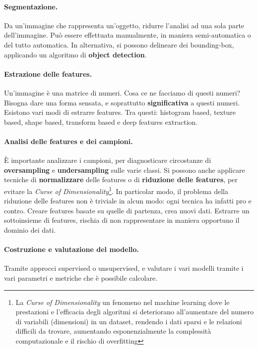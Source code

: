 \paragraph{Segmentazione.} Da un'immagine che rappresenta un'oggetto, ridurre l'analisi ad una sola parte dell'immagine. Può essere effettuata manualmente, in maniera semi-automatica o del tutto automatica. In alternativa, si possono delineare dei bounding-box, applicando un algoritmo di \textbf{object detection}.

\paragraph{Estrazione delle features.} Un'immagine è una matrice di numeri. Cosa ce ne facciamo di questi numeri? Bisogna dare una forma sensata, e soprattutto \textbf{significativa} a questi numeri. Esistono vari modi di estrarre features. Tra questi: histogram based, texture based, shape based, transform based e deep features extraction.

\paragraph{Analisi delle features e dei campioni.} È importante analizzare i campioni, per diagnosticare circostanze di \textbf{oversampling} e \textbf{undersampling} sulle varie classi. Si possono anche applicare tecniche di \textbf{normalizzare} delle features o di \textbf{riduzione delle features}, per evitare la \textit{Curse of Dimensionality}\footnote{La \textit{Curse of Dimensionality} un fenomeno nel machine learning dove le prestazioni e l'efficacia degli algoritmi si deteriorano all'aumentare del numero di variabili (dimensioni) in un dataset, rendendo i dati sparsi e le relazioni difficili da trovare, aumentando esponenzialmente la complessità computazionale e il rischio di overfitting}. In particolar modo, il problema della riduzione delle features non è triviale in alcun modo: ogni tecnica ha infatti pro e contro. Creare features basate su quelle di partenza, crea nuovi dati. Estrarre un sottoinsieme di features, rischia di non rappresentare in maniera opportuno il dominio dei dati.

\paragraph{Costruzione e valutazione del modello.} Tramite approcci supervised o unsupervised, e valutare i vari modelli tramite i vari parametri e metriche che è possibile calcolare.

